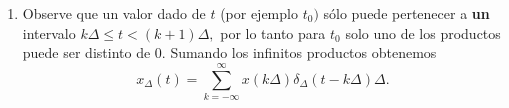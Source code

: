 \begin{enumerate}
\begin{equation}
\begin{array}{c}
                                \left\{ \begin{array}{l}
                                                \frac{x\left( \Delta \right) }{\Delta }\Delta ,         \\ 
                                                0,
                                        \end{array}
                                        \begin{array}{l}
                                                \Delta \leq t<2\Delta ,                                 \\ 
                                                \left( t<\Delta \right) \vee \left( 2\Delta \leq t\right) ,
                                        \end{array}
                                \right.                                                                 \\ 
                        ... \\ 
                        x\left( k\Delta \right) \delta _{\Delta }\left( t-k\Delta \right) \Delta =
                                \left\{ \begin{array}{l}
                                                \frac{x\left( k\Delta \right) }{\Delta }\Delta ,        \\ 
                                                0,
                                        \end{array}
                       \begin{array}{l}
                             k\Delta \leq t<\left( k+1\right) \Delta ,               \\ 
                             \left( t<k\Delta \right) \vee \left( \left( k+1\right) \Delta \leq t\right) .
                       \end{array}
                       \right.
        \end{array}
\end{equation}
\item Observe que un valor dado de $t$ (por ejemplo $t_{0})$ s\'{o}lo puede pertenecer a \textbf{un} intervalo 
$k\Delta \leq t<\left( k+1\right) \Delta,$ por lo tanto para $t_{0}$ solo uno de los productos puede ser 
distinto de $0$. Sumando los infinitos productos obtenemos 
\begin{equation}
   x_{\Delta }\left( t\right) =
     \sum_{k=-\infty }^{\infty }x\left( k\Delta \right) \delta
     _{\Delta }\left( t-k\Delta \right) \Delta . \label{funcaspulsessum}
\end{equation}
\end{enumerate}

